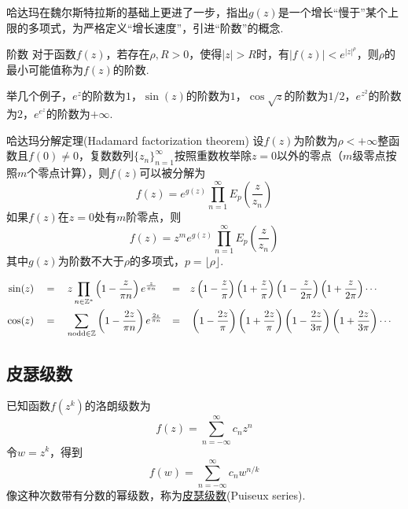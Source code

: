 哈达玛在魏尔斯特拉斯的基础上更进了一步，指出\(g(z)\)是一个增长“慢于”某个上限的多项式，为严格定义“增长速度”，引进“阶数”的概念.

\begin{definition}{阶数}
    对于函数\(f(z)\)，若存在\(\rho,R>0\)，使得\(|z|>R\)时，有\(|f(z)|<e^{|z|^{\rho}}\)，则\(\rho\)的最小可能值称为\(f(z)\)的阶数.
\end{definition}

举几个例子，\(e^z\)的阶数为\(1\)，\(\sin(z)\)的阶数为\(1\)，\(\cos\sqrt z\)的阶数为\(1/2\)，\(e^{z^2}\)的阶数为\(2\)，\(e^{e^z}\)的阶数为\(+\infty\).

\begin{theorem}{哈达玛分解定理(Hadamard factorization theorem)}
    设\(f(z)\)为阶数为\(\rho<+\infty\)整函数且\(f(0)\neq 0\)，复数数列\(\{z_n\}_{n=1}^{\infty}\)按照重数枚举除\(z=0\)以外的零点（\(m\)级零点按照\(m\)个零点计算），则\(f(z)\)可以被分解为
    \[f(z) = e^{g(z)}\prod_{n=1}^{\infty}E_{p}\left(\frac{z}{z_n}\right)\]
    如果\(f(z)\)在\(z=0\)处有\(m\)阶零点，则
    \[f(z) = z^me^{g(z)}\prod_{n=1}^{\infty}E_{p}\left(\frac{z}{z_n}\right)\]
    其中\(g(z)\)为阶数不大于\(\rho\)的多项式，\(p=\lfloor \rho \rfloor\).
\end{theorem}

\begin{align*}
    \sin(z) \quad&=\quad z\prod_{n \in \mathbb{Z}^*}\left(1-\frac{z}{\pi n}\right)e^{\frac{z}{\pi n}} &=&\quad z \left(1-\frac{z}{\pi}\right)\left(1+\frac{z}{\pi}\right)\left(1-\frac{z}{2\pi}\right)\left(1+\frac{z}{2\pi}\right)\cdots & \\
    \cos(z) \quad&=\quad \sum_{n {\rm odd} \in \mathbb{Z}}\left(1-\frac{2z}{\pi n}\right)e^{\frac{2z}{\pi n}} &=&\quad \left(1-\frac{2z}{\pi}\right)\left(1+\frac{2z}{\pi}\right)\left(1-\frac{2z}{3\pi}\right)\left(1+\frac{2z}{3\pi}\right)\cdots & \\
\end{align*}

\subsection{皮瑟级数}

已知函数\(f(z^k)\)的洛朗级数为
\[f(z) = \sum_{n=-\infty}^{\infty} c_nz^{n}\]
令\(w=z^k\)，得到
\[f(w) = \sum_{n=-\infty}^{\infty} c_nw^{n/k}\]
像这种次数带有分数的幂级数，称为\uline{皮瑟级数}(Puiseux series).

